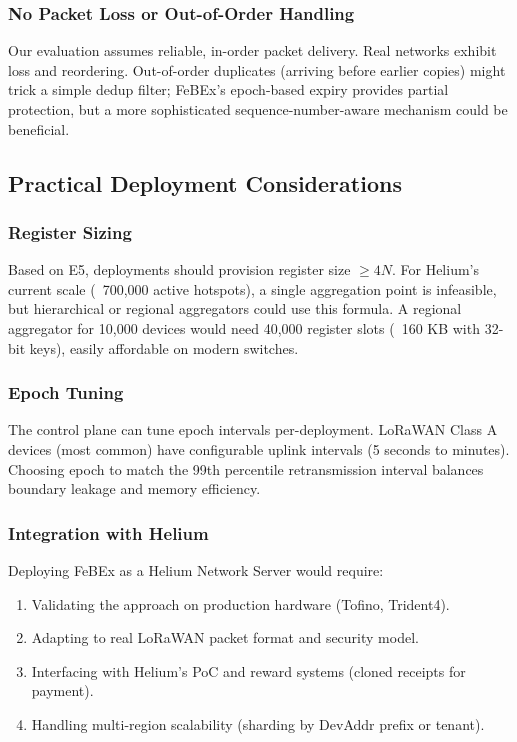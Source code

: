 \subsubsection{No Packet Loss or Out-of-Order Handling}

Our evaluation assumes reliable, in-order packet delivery. Real networks exhibit loss and reordering. Out-of-order duplicates (arriving before earlier copies) might trick a simple dedup filter; FeBEx's epoch-based expiry provides partial protection, but a more sophisticated sequence-number-aware mechanism could be beneficial.

\subsection{Practical Deployment Considerations}

\subsubsection{Register Sizing}

Based on E5, deployments should provision register size $\geq 4N$. For Helium's current scale (~700,000 active hotspots), a single aggregation point is infeasible, but hierarchical or regional aggregators could use this formula. A regional aggregator for 10,000 devices would need 40,000 register slots (~160 KB with 32-bit keys), easily affordable on modern switches.

\subsubsection{Epoch Tuning}

The control plane can tune epoch intervals per-deployment. LoRaWAN Class A devices (most common) have configurable uplink intervals (5 seconds to minutes). Choosing epoch to match the 99th percentile retransmission interval balances boundary leakage and memory efficiency.

\subsubsection{Integration with Helium}

Deploying FeBEx as a Helium Network Server would require:
\begin{enumerate}
    \item Validating the approach on production hardware (Tofino, Trident4).
    \item Adapting to real LoRaWAN packet format and security model.
    \item Interfacing with Helium's PoC and reward systems (cloned receipts for payment).
    \item Handling multi-region scalability (sharding by DevAddr prefix or tenant).
\end{enumerate}

